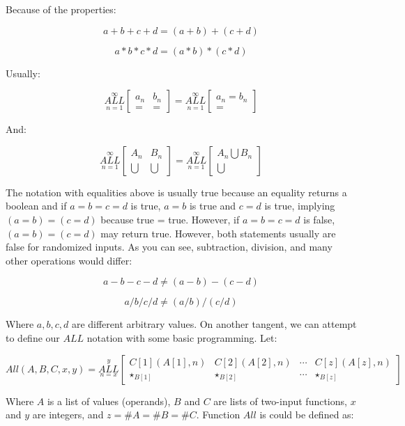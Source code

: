 \documentclass{article}
\begin{document}
Because of the properties:

$$a+b+c+d=(a+b)+(c+d)$$

$$a*b*c*d=(a*b)*(c*d)$$

Usually:

$$\underset{n=1}{\overset{\infty}{ALL}} \begin{bmatrix}
a_n & b_n \\
=& =
\end{bmatrix} = \underset{n=1}{\overset{\infty}{ALL}} \begin{bmatrix}
a_n = b_n \\
 =
\end{bmatrix}$$

And:

$$\underset{n=1}{\overset{\infty}{ALL}} \begin{bmatrix}
A_n & B_n \\
\bigcup & \bigcup
\end{bmatrix} = \underset{n=1}{\overset{\infty}{ALL}} \begin{bmatrix}
A_n \bigcup B_n \\
 \bigcup
\end{bmatrix}$$

The notation with equalities above is usually true because an equality returns a boolean and if $a=b=c=d$ is true, $a=b$ is true and $c=d$ is true, implying $(a=b)=(c=d)$ because true = true. However, if $a=b=c=d$ is false, $(a=b)=(c=d)$ may return true. However, both statements usually are false for randomized inputs. As you can see, subtraction, division, and many other operations would differ:

$$a-b-c-d \neq (a-b) - (c-d)$$

$$a/b/c/d \neq (a/b)/(c/d)$$

Where $a,b,c,d$ are different arbitrary values. On another tangent, we can attempt to define our $ALL$ notation with some basic programming. Let:

$$All(A, B, C, x, y)=\underset{n=x}{\overset{y}{ALL}} \begin{bmatrix}
C[1](A[1],n) & C[2](A[2],n) & \cdots & C[z](A[z],n) \\
\star_{B[1]}& \star_{B[2]} & \cdots & \star_{B[z]}
\end{bmatrix}$$

Where $A$ is a list of values (operands), $B$ and $C$ are lists of two-input functions, $x$ and $y$ are integers, and $z = \# A = \# B = \# C$. Function $All$ is could be defined as:

$${}$$
\end{document}
